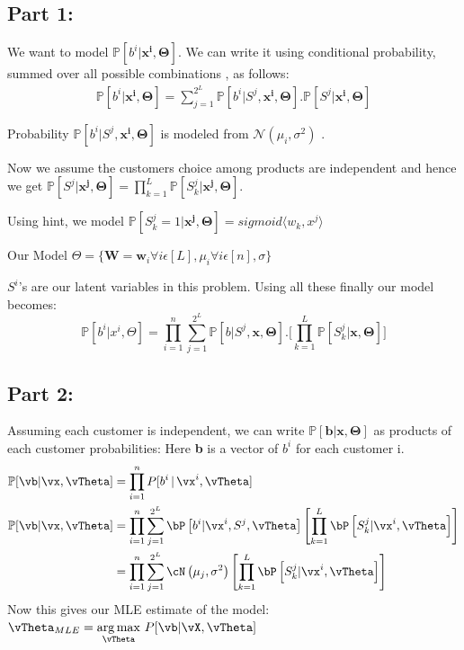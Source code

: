 \documentclass[a4paper,11pt]{article}
\begin{document}
\begin{mlsolution}
\subsection*{Part 1:}
We want to model $\mathbb{P}[b^i | \mathbf{x^i,\Theta}]$. We can write it using conditional probability, summed over all possible combinations , as follows:
\begin{align*}
\mathbb{P}[b^i | \mathbf{x^i,\Theta}] = \sum_{j=1}^{2^L}\mathbb{P}[b^i| S^j,\mathbf{x^i,\Theta}].\mathbb{P}[S^j|\mathbf{x^i,\Theta}]
\end{align*} 

Probability $\mathbb{P}[b^i | S^j,\mathbf{x^i,\Theta}]$ is modeled from $\mathcal{N}(\mu_i,\sigma^2)$ .

Now we assume the customers choice among products are independent and hence we get $\mathbb{P}[S^j|\mathbf{x^j,\Theta}] = \prod_{k=1}^{L}\mathbb{P}[S_k^j|\mathbf{x^j,\Theta}]$.

Using hint, we model $\mathbb{P}[S_k^j = 1 | \mathbf{x^j,\Theta}] = sigmoid\langle w_k,x^j\rangle$ 

Our Model $\Theta = \{\mathbf{W}={\mathbf{w}_i}\forall i\epsilon[L], \mu_i\forall i\epsilon[n],\sigma\}$

$S^i$'s are our latent variables in this problem. 
Using all these finally our model becomes:
\begin{equation}
\mathbb{P}[b^i|x^i,\Theta]= \prod_{i=1}^{n}\sum_{j=1}^{2^L}\mathbb{P}[b| S^j,\mathbf{x,\Theta}].\Big[\prod_{k=1}^{L}\mathbb{P}[S_k^j|\mathbf{x,\Theta}] \Big]
\end{equation}
\subsection{Part 2:}
	Assuming each customer is independent, we can write $\mathbb{P}[\mathbf{b | x,\Theta}]$ as products of each customer probabilities: Here \textbf{b} is a vector of $b^i$ for each customer i.
	\begin{align*}
	\mathbb{P}[\vb|\vx, \vTheta] &= \prod_{i=1}^{n} P[b^i \cond \vx^i, \vTheta]\\
	\mathbb{P}[\vb|\vx, \vTheta] &= \prod_{i=1}^{n}\sum_{j=1}^{2^L} \P{b^i|\vx^i,S^j,\vTheta} \left[\prod_{k=1}^{L} \P{S^j_k| \vx^i, \vTheta}\right]\\
	&= \prod_{i=1}^{n}\sum_{j=1}^{2^L} \cN\left(\mu_j,\sigma^2\right) \left[\prod_{k=1}^{L} \P{S^j_k| \vx^i, \vTheta}\right]	\\
	\end{align*}
Now this gives our MLE estimate of the model: $\vTheta_{MLE} = \underset{\vTheta}{\arg\max}\ P[\vb| \vX, \vTheta]$	
	\newpage

\end{mlsolution}
\end{document}
